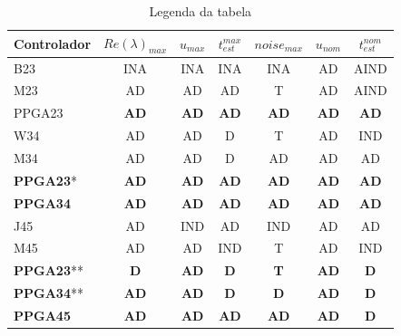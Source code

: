 \documentclass[twoside]{article}
\begin{document}
\begin{multicols}{2}
  \begin{table}[ht]
    \centering
    \caption{Legenda da tabela }
    \label{tabladeseables}
    \begin{tabular}{lcccccc}   \hline
      Controlador       & $Re(\lambda)_{max}$ & $u_{max}$   & $t_{est}^{max}$ & $noise_{max}$ & $u_{nom}$   & $t_{est}^{nom}$ \\ \hline
      B23               & INA                 & INA         & INA             & INA           & AD          & AIND            \\
      M23               & AD                  & AD          & AD              & T             & AD          & AIND            \\
      PPGA23            & \textbf{AD}         & \textbf{AD} & \textbf{AD}     & \textbf{AD}   & \textbf{AD} & \textbf{AD}     \\
      \hline
      W34               & AD                  & AD          & D               & T             & AD          & IND             \\
      M34               & AD                  & AD          & D               & AD            & AD          & AD              \\
      \textbf{PPGA23}*  & \textbf{AD}         & \textbf{AD} & \textbf{AD}     & \textbf{AD}   & \textbf{AD} & \textbf{AD}     \\
      \textbf{PPGA34}   & \textbf{AD}         & \textbf{AD} & \textbf{AD}     & \textbf{AD}   & \textbf{AD} & \textbf{AD}     \\
      \hline
      J45               & AD                  & IND         & AD              & IND           & AD          & AD              \\
      M45               & AD                  & AD          & IND             & T             & AD          & IND             \\
      \textbf{PPGA23}** & \textbf{D}          & \textbf{AD} & \textbf{D}      & \textbf{T}    & \textbf{AD} & \textbf{D}      \\
      \textbf{PPGA34}** & \textbf{AD}         & \textbf{AD} & \textbf{D}      & \textbf{D}    & \textbf{AD} & \textbf{D}      \\
      \textbf{PPGA45}   & \textbf{AD}         & \textbf{AD} & \textbf{AD}     & \textbf{AD}   & \textbf{AD} & \textbf{D}      \\
      \hline
    \end{tabular}
  \end{table}



\end{multicols}
\end{document}
